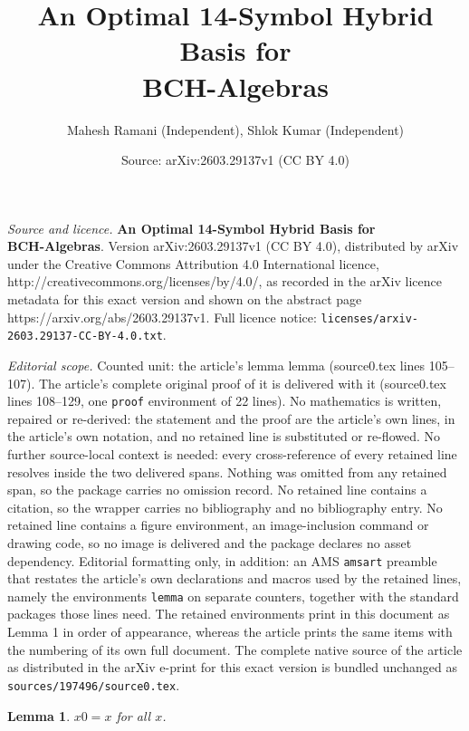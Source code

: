 \documentclass[10pt,a4paper]{amsart}
\title{\textbf{An Optimal 14-Symbol Hybrid Basis for \\ BCH-Algebras}}
\author{Mahesh Ramani (Independent), Shlok Kumar (Independent)}
\date{Source: arXiv:2603.29137v1 (CC BY 4.0)}
\newtheorem{lemma}{Lemma}
\begin{document}
\maketitle

\noindent\emph{Source and licence.} \textbf{An Optimal 14-Symbol Hybrid Basis for \\ BCH-Algebras}. Version arXiv:2603.29137v1 (CC BY 4.0), distributed by arXiv under the Creative Commons Attribution 4.0 International licence, http://creativecommons.org/licenses/by/4.0/, as recorded in the arXiv licence metadata for this exact version and shown on the abstract page https://arxiv.org/abs/2603.29137v1. Full licence notice: \texttt{licenses/arxiv-2603.29137-CC-BY-4.0.txt}.\par\smallskip

\noindent\textit{Editorial scope.} Counted unit: the article's lemma lemma (source0.tex lines 105--107). The article's complete original proof of it is delivered with it (source0.tex lines 108--129, one \texttt{proof} environment of 22 lines). No mathematics is written, repaired or re-derived: the statement and the proof are the article's own lines, in the article's own notation, and no retained line is substituted or re-flowed.  No further source-local context is needed: every cross-reference of every retained line resolves inside the two delivered spans.  Nothing was omitted from any retained span, so the package carries no omission record.  No retained line contains a citation, so the wrapper carries no bibliography and no bibliography entry.  No retained line contains a figure environment, an image-inclusion command or drawing code, so no image is delivered and the package declares no asset dependency.  Editorial formatting only, in addition: an AMS \texttt{amsart} preamble that restates the article's own declarations and macros used by the retained lines, namely the environments \texttt{lemma} on separate counters, together with the standard packages those lines need.  The retained environments print in this document as Lemma 1 in order of appearance, whereas the article prints the same items with the numbering of its own full document.  The complete native source of the article as distributed in the arXiv e-print for this exact version is bundled unchanged as \texttt{sources/197496/source0.tex}.
\begin{lemma}
$x0 = x$ for all $x$.
\end{lemma}
\end{document}
